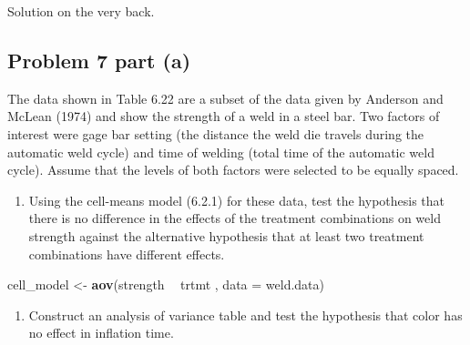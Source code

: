 \documentclass[12pt,]{article}
\newenvironment{Shaded}{\begin{snugshade}}{\end{snugshade}}
\newcommand{\KeywordTok}[1]{\textcolor[rgb]{0.13,0.29,0.53}{\textbf{#1}}}
\newcommand{\DataTypeTok}[1]{\textcolor[rgb]{0.13,0.29,0.53}{#1}}
\newcommand{\StringTok}[1]{\textcolor[rgb]{0.31,0.60,0.02}{#1}}
\newcommand{\OtherTok}[1]{\textcolor[rgb]{0.56,0.35,0.01}{#1}}
\newcommand{\OperatorTok}[1]{\textcolor[rgb]{0.81,0.36,0.00}{\textbf{#1}}}
\newcommand{\NormalTok}[1]{#1}
\providecommand{\tightlist}{%
  \setlength{\itemsep}{0pt}\setlength{\parskip}{0pt}}
\begin{document}
Solution on the very back.

\subsection{Problem 7 part (a)}\label{problem-7-part-a}

The data shown in Table 6.22 are a subset of the data given by Anderson
and McLean (1974) and show the strength of a weld in a steel bar. Two
factors of interest were gage bar setting (the distance the weld die
travels during the automatic weld cycle) and time of welding (total time
of the automatic weld cycle). Assume that the levels of both factors
were selected to be equally spaced.

\begin{Shaded}
\end{Shaded}

\begin{enumerate}
\def\labelenumi{(\alph{enumi})}
\tightlist
\item
  Using the cell-means model (6.2.1) for these data, test the hypothesis
  that there is no difference in the effects of the treatment
  combinations on weld strength against the alternative hypothesis that
  at least two treatment combinations have different effects.
\end{enumerate}

\begin{Shaded}
\begin{Highlighting}[]
\NormalTok{cell_model <-}\StringTok{ }\KeywordTok{aov}\NormalTok{(strength }\OperatorTok{~}\StringTok{ }\NormalTok{trtmt , }\DataTypeTok{data =}\NormalTok{ weld.data)}
\end{Highlighting}
\end{Shaded}

\begin{enumerate}
\def\labelenumi{(\alph{enumi})}
\setcounter{enumi}{2}
\tightlist
\item
  Construct an analysis of variance table and test the hypothesis that
  color has no effect in inflation time.
\end{enumerate}
\end{document}
